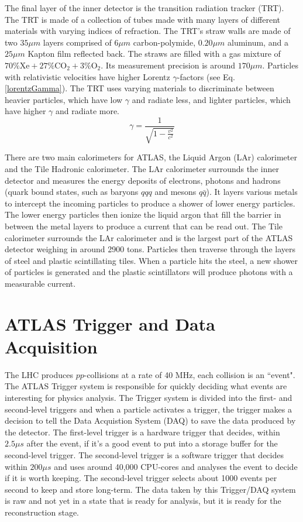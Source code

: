 The final layer of the inner detector is the transition radiation tracker (TRT). 
The TRT is made of a collection of tubes made with many layers of different materials with varying indices of refraction.
The TRT's straw walls are made of two $35\mu m$ layers comprised of $6\mu m$ carbon-polymide, $0.20 \mu m$ aluminum, and a $25\mu m$ Kapton film reflected back.\cite{TRT_2008}
The straws are filled with a gas mixture of $70\% \text{Xe} + 27\% \text{CO}_2 + 3\% \text{O}_2$. 
Its measurement precision is around $170 \mu m$. 
Particles with relativistic velocities have higher Lorentz $\gamma$-factors (see Eq. \eqref{lorentzGamma}). 
The TRT uses varying materials to discriminate between heavier particles, which have low $\gamma$ and radiate less, and lighter particles, which have higher $\gamma$ and radiate more. \cite{Mindur:2139567}
\begin{equation}\label{lorentzGamma}
    \gamma = \frac{1}{\sqrt{1 - \frac{v^2}{c^2}}}
\end{equation}

There are two main calorimeters for ATLAS, the Liquid Argon (LAr) calorimeter and the Tile Hadronic calorimeter.
The LAr calorimeter surrounds the inner detector and measures the energy deposits of electrons, photons and hadrons (quark bound states, such as baryons $qqq$ and mesons $q\bar{q}$). 
It layers various metals to intercept the incoming particles to produce a shower of lower energy particles. 
The lower energy particles then ionize the liquid argon that fill the barrier in between the metal layers to produce a current that can be read out.
The Tile calorimeter surrounds the LAr calorimeter and is the largest part of the ATLAS detector weighing in around 2900 tons. 
Particles then traverse through the layers of steel and plastic scintillating tiles. 
When a particle hits the steel, a new shower of particles is generated and the plastic scintillators will produce photons with a measurable current.

\section{ATLAS Trigger and Data Acquisition}

The LHC produces $pp$-collisions at a rate of 40 MHz, each collision is an ``event". 
The ATLAS Trigger system is responsible for quickly deciding what events are interesting for physics analysis.
The Trigger system is divided into the first- and second-level triggers and when a particle activates a trigger, the trigger makes a decision to tell the Data Acquistion System (DAQ) to save the data produced by the detector. 
The first-level trigger is a hardware trigger that decides, within $2.5 \mu s$ after the event, if it's a good event to put into a storage buffer for the second-level trigger.
The second-level trigger is a software trigger that decides within $200 \mu s$ and uses around 40,000 CPU-cores and analyses the event to decide if it is worth keeping. 
The second-level trigger selects about 1000 events per second to keep and store long-term. \cite{Trigger-DAQ}
The data taken by this Trigger/DAQ system is raw and not yet in a state that is ready for analysis, but it is ready for the reconstruction stage. 

